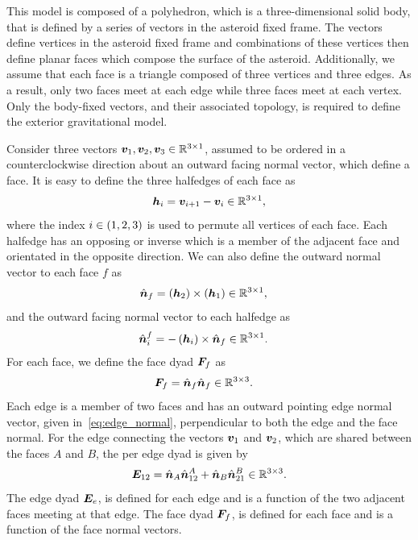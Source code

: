 This model is composed of a polyhedron, which is a three-dimensional solid body, that is defined by a series of vectors in the asteroid fixed frame.
The vectors define vertices in the asteroid fixed frame and combinations of these vertices then define planar faces which compose the surface of the asteroid.
Additionally, we assume that each face is a triangle composed of three vertices and three edges.
As a result, only two faces meet at each edge while three faces meet at each vertex.
Only the body-fixed vectors, and their associated topology, is required to define the exterior gravitational model.

Consider three vectors \( \bm{v}_1, \bm{v}_2, \bm{v}_3 \in \mathbb{R}^{3 \times 1} \), assumed to be ordered in a counterclockwise direction about an outward facing normal vector, which define a face.
It is easy to define the three halfedges of each face as
\begin{align}\label{eq:edges}
    \bm{h}_{i} = \bm{v}_{i+1} - \bm{v}_i \in \mathbb{R}^{3 \times 1 },
\end{align}
where the index \( i \in \left( 1,2,3 \right) \) is used to permute all vertices of each face.
Each halfedge has an opposing or inverse which is a member of the adjacent face and orientated in the opposite direction.
We can also define the outward normal vector to each face \( f \) as
\begin{align}\label{eq:face_normal}
    \hat{\bm{n}}_f &= \left( \bm{h}_2 \right) \times \left( \bm{h}_1 \right) \in \mathbb{R}^{3 \times 1},
\end{align}
and the outward facing normal vector to each halfedge as
\begin{align}\label{eq:edge_normal}
    \hat{\bm{n}}_{i}^f &= - \left( \bm{h}_i \right) \times \hat{\bm{n}}_f \in \mathbb{R}^{3 \times 1}.
\end{align}
For each face, we define the face dyad \( \bm{F}_f \) as
\begin{align}\label{eq:face_dyad}
    \bm{F}_f &= \hat{\bm{n}}_f \hat{\bm{n}}_f \in \mathbb{R}^{3 \times 3}.
\end{align}
Each edge is a member of two faces and has an outward pointing edge normal vector, given in~\cref{eq:edge_normal}, perpendicular to both the edge and the face normal.
For the edge connecting the vectors \( \bm{v}_1 \) and \( \bm{v}_2 \), which are shared between the faces \(A\) and \( B\), the per edge dyad is given by
\begin{align}\label{eq:edge_dyad}
    \bm{E}_{12} = \hat{\bm{n}}_A \hat{\bm{n}}_{12}^A + \hat{\bm{n}}_B \hat{\bm{n}}_{21}^B \in \mathbb{R}^{3 \times 3}.
\end{align}
The edge dyad \( \bm{E}_e  \), is defined for each edge and is a function of the two adjacent faces meeting at that edge.
The face dyad \( \bm{F}_f \), is defined for each face and is a function of the face normal vectors.

